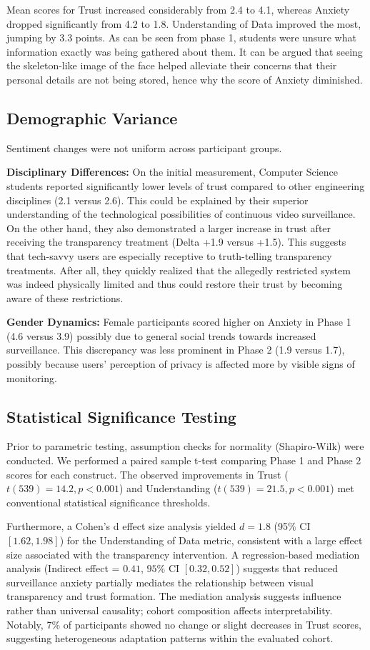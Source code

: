 \documentclass[conference]{IEEEtran}
\begin{document}
Mean scores for Trust increased considerably from 2.4 to 4.1, whereas Anxiety dropped significantly from 4.2 to 1.8. Understanding of Data improved the most, jumping by 3.3 points. As can be seen from phase 1, students were unsure what information exactly was being gathered about them. It can be argued that seeing the skeleton-like image of the face helped alleviate their concerns that their personal details are not being stored, hence why the score of Anxiety diminished.

\subsection{Demographic Variance}
Sentiment changes were not uniform across participant groups.

\textbf{Disciplinary Differences:} On the initial measurement, Computer Science students reported significantly lower levels of trust compared to other engineering disciplines (2.1 versus 2.6). This could be explained by their superior understanding of the technological possibilities of continuous video surveillance. On the other hand, they also demonstrated a larger increase in trust after receiving the transparency treatment (Delta +1.9 versus +1.5). This suggests that tech-savvy users are especially receptive to truth-telling transparency treatments. After all, they quickly realized that the allegedly restricted system was indeed physically limited and thus could restore their trust by becoming aware of these restrictions.

\textbf{Gender Dynamics:} Female participants scored higher on Anxiety in Phase 1 (4.6 versus 3.9) possibly due to general social trends towards increased surveillance. This discrepancy was less prominent in Phase 2 (1.9 versus 1.7), possibly because users’ perception of privacy is affected more by visible signs of monitoring.

\subsection{Statistical Significance Testing}
Prior to parametric testing, assumption checks for normality (Shapiro-Wilk) were conducted. We performed a paired sample t-test comparing Phase 1 and Phase 2 scores for each construct. The observed improvements in Trust ($t(539) = 14.2, p < 0.001$) and Understanding ($t(539) = 21.5, p < 0.001$) met conventional statistical significance thresholds. 

Furthermore, a Cohen's d effect size analysis yielded $d=1.8$ (95\% CI $[1.62, 1.98]$) for the Understanding of Data metric, consistent with a large effect size associated with the transparency intervention. A regression-based mediation analysis (Indirect effect = $0.41$, $95\%$ CI $[0.32, 0.52]$) suggests that reduced surveillance anxiety partially mediates the relationship between visual transparency and trust formation. The mediation analysis suggests influence rather than universal causality; cohort composition affects interpretability. Notably, 7\% of participants showed no change or slight decreases in Trust scores, suggesting heterogeneous adaptation patterns within the evaluated cohort.
\end{document}
